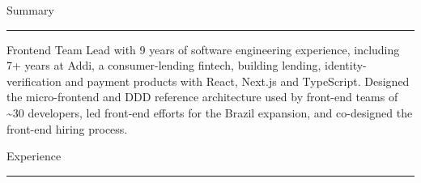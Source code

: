 \documentclass[10pt,a4paper]{article}
\renewcommand{\section}[1]{%
  \vspace{7pt}%
  {\fontsize{14}{16}\selectfont\color{heading}#1}\par
  \vspace{-4pt}\rule{\linewidth}{0.6pt}\par\vspace{3pt}}
\begin{document}
\hfill
\begin{minipage}[t]{0.71\textwidth}
\vspace{0pt}
\section{Summary}
Frontend Team Lead with 9 years of software engineering experience, including 7+ years at Addi, a
consumer-lending fintech, building lending, identity-verification and payment products with React,
Next.js and TypeScript. Designed the micro-frontend and DDD reference architecture used by front-end teams of
\textasciitilde30 developers, led front-end efforts for the Brazil expansion, and co-designed the front-end hiring process.

\section{Experience}


\end{minipage}
\end{document}
